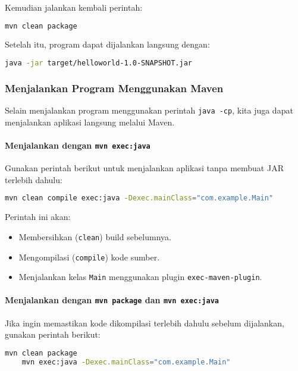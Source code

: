 
Kemudian jalankan kembali perintah:

\begin{lstlisting}[language=bash]
	mvn clean package
\end{lstlisting}

Setelah itu, program dapat dijalankan langsung dengan:

\begin{lstlisting}[language=bash]
	java -jar target/helloworld-1.0-SNAPSHOT.jar
\end{lstlisting}


\subsubsection{Menjalankan Program Menggunakan Maven}
Selain menjalankan program menggunakan perintah \texttt{java -cp}, kita juga dapat menjalankan aplikasi langsung melalui Maven.

\paragraph{Menjalankan dengan \texttt{mvn exec:java}}
Gunakan perintah berikut untuk menjalankan aplikasi tanpa membuat JAR terlebih dahulu:

\begin{lstlisting}[language=bash]
	mvn clean compile exec:java -Dexec.mainClass="com.example.Main"
\end{lstlisting}

Perintah ini akan:
\begin{itemize}
	\item Membersihkan (\texttt{clean}) build sebelumnya.
	\item Mengompilasi (\texttt{compile}) kode sumber.
	\item Menjalankan kelas \texttt{Main} menggunakan plugin \texttt{exec-maven-plugin}.
\end{itemize}

\paragraph{Menjalankan dengan \texttt{mvn package} dan \texttt{mvn exec:java}}
Jika ingin memastikan kode dikompilasi terlebih dahulu sebelum dijalankan, gunakan perintah berikut:

\begin{lstlisting}[language=bash]
	mvn clean package
	mvn exec:java -Dexec.mainClass="com.example.Main"
\end{lstlisting}

